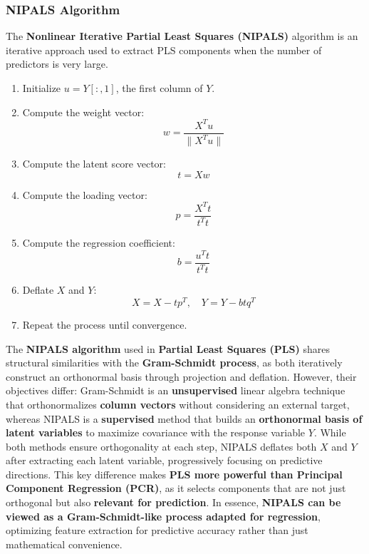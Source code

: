 \documentclass[11pt,twoside,a4paper]{article}
\begin{document}
\subsubsection{NIPALS Algorithm}
The \textbf{Nonlinear Iterative Partial Least Squares (NIPALS)} algorithm is an iterative approach used to extract PLS components when the number of predictors is very large.

\begin{enumerate}
    \item Initialize \( u = Y[:,1] \), the first column of \( Y \).
    \item Compute the weight vector:
        \[
        w = \frac{X^T u}{\|X^T u\|}
        \]
    \item Compute the latent score vector:
        \[
        t = Xw
        \]
    \item Compute the loading vector:
        \[
        p = \frac{X^T t}{t^T t}
        \]
    \item Compute the regression coefficient:
        \[
        b = \frac{u^T t}{t^T t}
        \]
    \item Deflate \( X \) and \( Y \):
        \[
        X = X - tp^T, \quad Y = Y - btq^T
        \]
    \item Repeat the process until convergence.
\end{enumerate}

The \textbf{NIPALS algorithm} used in \textbf{Partial Least Squares (PLS)} shares structural similarities with the \textbf{Gram-Schmidt process}, as both iteratively construct an orthonormal basis through projection and deflation. However, their objectives differ: Gram-Schmidt is an \textbf{unsupervised} linear algebra technique that orthonormalizes \textbf{column vectors} without considering an external target, whereas NIPALS is a \textbf{supervised} method that builds an \textbf{orthonormal basis of latent variables} to maximize covariance with the response variable \( Y \). While both methods ensure orthogonality at each step, NIPALS deflates both \( X \) and \( Y \) after extracting each latent variable, progressively focusing on predictive directions. This key difference makes \textbf{PLS more powerful than Principal Component Regression (PCR)}, as it selects components that are not just orthogonal but also \textbf{relevant for prediction}. In essence, \textbf{NIPALS can be viewed as a Gram-Schmidt-like process adapted for regression}, optimizing feature extraction for predictive accuracy rather than just mathematical convenience.
\end{document}
